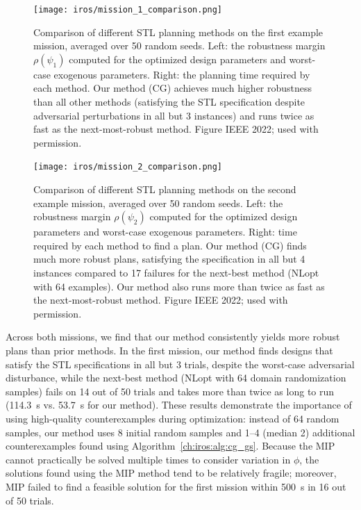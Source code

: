 \begin{figure}[tbh]
    \centering
    \texttt{[image: iros/mission\_1\_comparison.png]}
    \caption{Comparison of different STL planning methods on the first example mission, averaged over 50 random seeds. Left: the robustness margin $\rho(\psi_1)$ computed for the optimized design parameters and worst-case exogenous parameters. Right: the planning time required by each method. Our method (CG) achieves much higher robustness than all other methods (satisfying the STL specification despite adversarial perturbations in all but 3 instances) and runs twice as fast as the next-most-robust method. Figure \textcopyright IEEE 2022; used with permission.}
    \label{ch:iros:fig:mission_1_comparison}
\end{figure}

\begin{figure}[tbh]
    \centering
    \texttt{[image: iros/mission\_2\_comparison.png]}
    \caption{Comparison of different STL planning methods on the second example mission, averaged over 50 random seeds. Left: the robustness margin $\rho(\psi_2)$ computed for the optimized design parameters and worst-case exogenous parameters. Right: time required by each method to find a plan. Our method (CG) finds much more robust plans, satisfying the specification in all but 4 instances compared to 17 failures for the next-best method (NLopt with 64 examples). Our method also runs more than twice as fast as the next-most-robust method. Figure \textcopyright IEEE 2022; used with permission.}
    \label{ch:iros:fig:mission_2_comparison}
\end{figure}

Across both missions, we find that our method consistently yields more robust plans than prior methods. In the first mission, our method finds designs that satisfy the STL specifications in all but 3 trials, despite the worst-case adversarial disturbance, while the next-best method (NLopt with 64 domain randomization samples) fails on 14 out of 50 trials and takes more than twice as long to run (\SI{114.3}{s} vs. \SI{53.7}{s} for our method). These results demonstrate the importance of using high-quality counterexamples during optimization: instead of 64 random samples, our method uses 8 initial random samples and 1--4 (median 2) additional counterexamples found using Algorithm~\ref{ch:iros:alg:cg_gs}. Because the MIP cannot practically be solved multiple times to consider variation in $\phi$, the solutions found using the MIP method tend to be relatively fragile; moreover, MIP failed to find a feasible solution for the first mission within \SI{500}{s} in 16 out of 50 trials.

